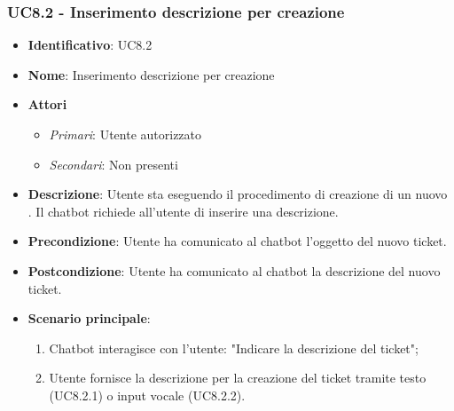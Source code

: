 \subsubsection{UC8.2 - Inserimento descrizione per creazione }
\begin{itemize}
	\item \textbf{Identificativo}: UC8.2
	\item \textbf{Nome}: Inserimento descrizione per creazione  
	\item \textbf{Attori}
	\begin{itemize} 
		\item \textit{Primari}: Utente autorizzato
		\item \textit{Secondari}: Non presenti
	\end{itemize}
	\item \textbf{Descrizione}:  Utente sta eseguendo il procedimento di creazione di un nuovo . Il chatbot richiede all'utente di inserire una descrizione. 
	\item \textbf{Precondizione}: Utente ha comunicato al chatbot l'oggetto del nuovo ticket.
	\item \textbf{Postcondizione}: Utente ha comunicato al chatbot la descrizione del nuovo ticket.
	\item \textbf{Scenario principale}: \begin{enumerate}
		\item Chatbot interagisce con l'utente: "Indicare la descrizione del ticket";
		\item Utente fornisce la descrizione per la creazione del ticket tramite testo (UC8.2.1) o input vocale (UC8.2.2).
	\end{enumerate}
	\end{itemize}

